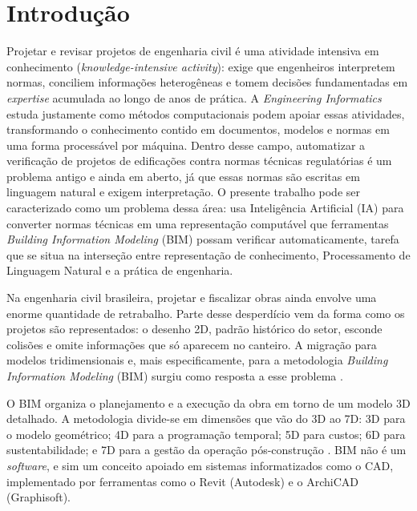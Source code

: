\documentclass[a4paper,fleqn]{cas-sc}
\begin{document}
\maketitle

\section{Introdução}\label{sec:introducao}
Projetar e revisar projetos de engenharia civil é uma atividade intensiva em conhecimento (\textit{knowledge-intensive activity}): exige que engenheiros interpretem normas, conciliem informações heterogêneas e tomem decisões fundamentadas em \textit{expertise} acumulada ao longo de anos de prática. A \textit{Engineering Informatics} estuda justamente como métodos computacionais podem apoiar essas atividades, transformando o conhecimento contido em documentos, modelos e normas em uma forma processável por máquina. Dentro desse campo, automatizar a verificação de projetos de edificações contra normas técnicas regulatórias é um problema antigo e ainda em aberto, já que essas normas são escritas em linguagem natural e exigem interpretação. O presente trabalho pode ser caracterizado como um problema dessa área: usa Inteligência Artificial (IA) para converter normas técnicas em uma representação computável que ferramentas \textit{Building Information Modeling} (BIM) possam verificar automaticamente, tarefa que se situa na interseção entre representação de conhecimento, Processamento de Linguagem Natural e a prática de engenharia.

Na engenharia civil brasileira, projetar e fiscalizar obras ainda envolve uma enorme quantidade de retrabalho. Parte desse desperdício vem da forma como os projetos são representados: o desenho 2D, padrão histórico do setor, esconde colisões e omite informações que só aparecem no canteiro. A migração para modelos tridimensionais e, mais especificamente, para a metodologia \textit{Building Information Modeling} (BIM) surgiu como resposta a esse problema \citep{eastman2011}.

O BIM organiza o planejamento e a execução da obra em torno de um modelo 3D detalhado. A metodologia divide-se em dimensões que vão do 3D ao 7D: 3D para o modelo geométrico; 4D para a programação temporal; 5D para custos; 6D para sustentabilidade; e 7D para a gestão da operação pós-construção \citep{eastman2011}. BIM não é um \textit{software}, e sim um conceito apoiado em sistemas informatizados como o CAD, implementado por ferramentas como o Revit (Autodesk) e o ArchiCAD (Graphisoft).
\end{document}
